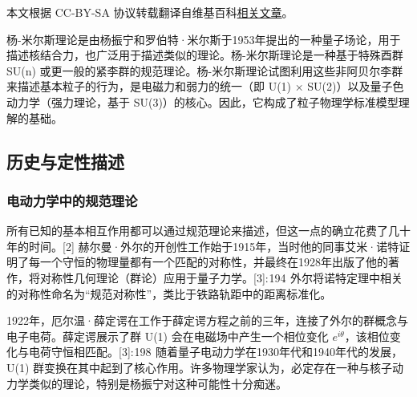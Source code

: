 
本文根据 CC-BY-SA 协议转载翻译自维基百科\href{https://en.wikipedia.org/wiki/Yang\%E2\%80\%93Mills_theory}{相关文章}。

杨-米尔斯理论是由杨振宁和罗伯特·米尔斯于1953年提出的一种量子场论，用于描述核结合力，也广泛用于描述类似的理论。杨-米尔斯理论是一种基于特殊酉群 SU(n) 或更一般的紧李群的规范理论。杨-米尔斯理论试图利用这些非阿贝尔李群来描述基本粒子的行为，是电磁力和弱力的统一（即 U(1) × SU(2)）以及量子色动力学（强力理论，基于 SU(3)）的核心。因此，它构成了粒子物理学标准模型理解的基础。
\subsection{历史与定性描述}  
\subsubsection{电动力学中的规范理论}  
所有已知的基本相互作用都可以通过规范理论来描述，但这一点的确立花费了几十年的时间。[2] 赫尔曼·外尔的开创性工作始于1915年，当时他的同事艾米·诺特证明了每一个守恒的物理量都有一个匹配的对称性，并最终在1928年出版了他的著作，将对称性几何理论（群论）应用于量子力学。[3]: 194  外尔将诺特定理中相关的对称性命名为“规范对称性”，类比于铁路轨距中的距离标准化。

1922年，厄尔温·薛定谔在工作于薛定谔方程之前的三年，连接了外尔的群概念与电子电荷。薛定谔展示了群 U(1) 会在电磁场中产生一个相位变化 \( e^{i\theta} \)，该相位变化与电荷守恒相匹配。[3]: 198  随着量子电动力学在1930年代和1940年代的发展，U(1) 群变换在其中起到了核心作用。许多物理学家认为，必定存在一种与核子动力学类似的理论，特别是杨振宁对这种可能性十分痴迷。